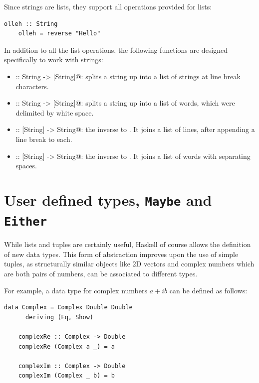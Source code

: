 \documentclass[UdineBachThesis,american,11pt]{PhdThesis}
\begin{document}
  Since strings are lists, they support all operations provided for lists:

  \begin{lstlisting}[gobble=4,basicstyle=\ttfamily\small]
    olleh :: String
    olleh = reverse "Hello"
  \end{lstlisting}

  In addition to all the list operations, the following functions are designed
  specifically to work with strings:

  \begin{itemize}
    \item \lstinline@lines :: String -> [String]@: splits a string up into a
    list of strings at line break characters.

    \item \lstinline@words :: String -> [String]@: splits a string up into a
    list of words, which were delimited by white space.

    \item \lstinline@unlines :: [String] -> String@: the inverse to
    \lstinline@lines@. It joins a list of lines, after appending a line break to
    each.

    \item \lstinline@unwords :: [String] -> String@: the inverse to
    \lstinline@words@. It joins a list of words with separating spaces.
  \end{itemize}

  \section{User defined types, \texttt{Maybe} and \texttt{Either}}
  \label{section:user-defined-types}

  While lists and tuples are certainly useful, Haskell of course allows the
  definition of new data types. This form of abstraction improves upon the use
  of simple tuples, as structurally similar objects like 2D vectors and complex
  numbers which are both pairs of numbers, can be associated to different types.

  For example, a data type for complex numbers $a + i b$ can be defined as
  follows:

  \begin{lstlisting}[gobble=4,basicstyle=\ttfamily\small]
    data Complex = Complex Double Double
      deriving (Eq, Show)

    complexRe :: Complex -> Double
    complexRe (Complex a _) = a

    complexIm :: Complex -> Double
    complexIm (Complex _ b) = b
  \end{lstlisting}
\end{document}
